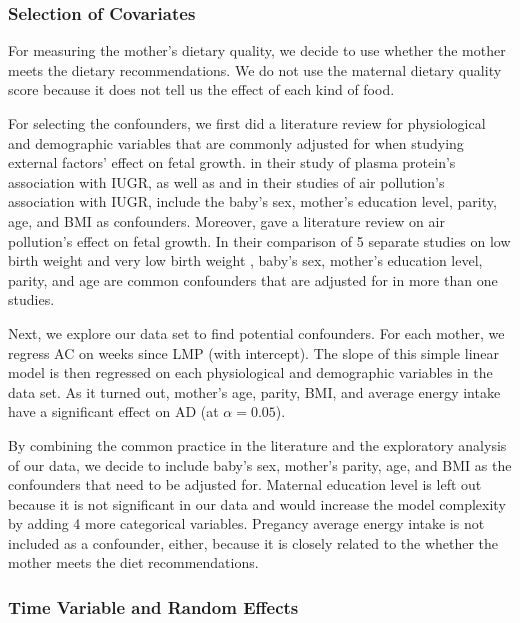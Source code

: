 \documentclass[12pt]{article}
\begin{document}
\subsubsection{Selection of Covariates}

For measuring the mother's dietary quality,
we decide to use whether the mother meets the dietary recommendations.
We do not use the maternal dietary quality score because it does not tell us the effect of each kind of food.

For selecting the confounders,
we first did a literature review
for physiological and demographic variables that are commonly adjusted for
when studying external factors' effect on fetal growth.
\citet{smith2002early} in their study of plasma protein's association with IUGR,
as well as \citet{berkowitz2003world} and \citet{choi2008prenatal} in their studies of air pollution's association with IUGR,
include the baby's sex, mother's education level, parity, age, and BMI as confounders.
Moreover, \citet{maisonet2004review} gave a literature review on air pollution's effect on fetal growth.
In their comparison of 5 separate studies on low birth weight and very low birth weight
\citep{
  alderman1987maternal,
  landgren1996environmental,
  bobak1999pregnancy,
  bobak2000outdoor,
  rogers2000association},
baby's sex, mother's education level, parity, and age
are common confounders that are adjusted for in more than one studies.

Next, we explore our data set to find potential confounders.
For each mother,
we regress AC on weeks since LMP (with intercept).
The slope of this simple linear model is then regressed on each physiological and demographic variables in the data set.
As it turned out,
mother's age, parity, BMI, and average energy intake have a significant effect on AD (at $\alpha = 0.05$).

By combining the common practice in the literature
and the exploratory analysis of our data,
we decide to include baby's sex, mother's parity, age, and BMI as the confounders that need to be adjusted for.
Maternal education level is left out because it is not significant in our data and would increase the model complexity by adding 4 more categorical variables.
Pregancy average energy intake is not included as a confounder, either,
because it is closely related to the whether the mother meets the diet recommendations.

\subsubsection{Time Variable and Random Effects}
\end{document}
